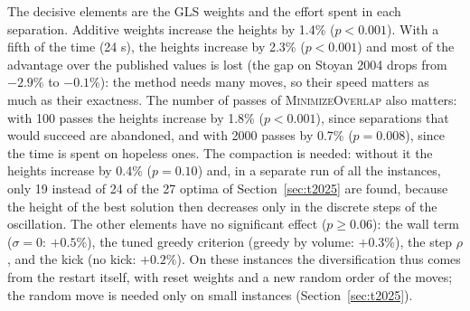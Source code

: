 \documentclass[preprint,12pt,authoryear]{elsarticle}
\begin{document}
The decisive elements are the GLS weights and the effort spent in each separation. Additive weights increase
the heights by 1.4\% ($p<0.001$). With a fifth of the time (24 s), the heights increase by 2.3\%
($p<0.001$) and most of the advantage over the published values is lost (the gap on Stoyan 2004 drops from
$-2.9\%$ to $-0.1\%$): the method needs many moves, so their speed matters as much as their exactness. The number of passes of
\textsc{MinimizeOverlap} also matters: with 100 passes the heights increase by 1.8\% ($p<0.001$), since
separations that would succeed are abandoned, and with 2000 passes by 0.7\% ($p=0.008$), since the time is spent
on hopeless ones. The compaction is needed: without it the heights increase by 0.4\% ($p=0.10$) and, in a
separate run of all the instances, only 19 instead of 24 of the 27 optima of Section~\ref{sec:t2025} are found,
because the height of the best solution then decreases only in the discrete steps of the oscillation. The other
elements have no significant effect ($p\ge0.06$): the wall term ($\sigma=0$: $+0.5\%$), the tuned greedy criterion
(greedy by volume: $+0.3\%$), the step $\rho$, and the kick (no kick: $+0.2\%$). On these instances the
diversification thus comes from the restart itself, with reset weights and a new random order of the moves; the
random move is needed only on small instances (Section~\ref{sec:t2025}).
\end{document}
